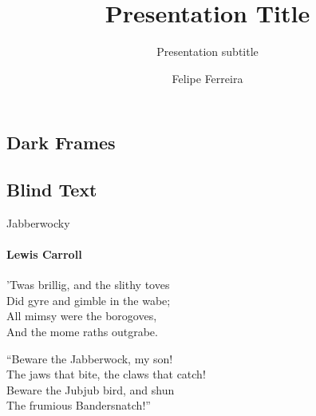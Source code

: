 \documentclass{beamer}
\title{Presentation Title}
\subtitle{Presentation subtitle}
\author{Felipe Ferreira}
\begin{document}
\frame[c]{\maketitle}


\begin{darkframes}
  \section{Dark Frames}
  \subsection{Blind Text}
  \begin{frame}{Jabberwocky}
    \framesubtitle{Lewis Carroll}%
    'Twas brillig, and the slithy toves\\
    Did gyre and gimble in the wabe;\\
    All mimsy were the borogoves,\\
    And the mome raths outgrabe.\\\bigskip

    “Beware the Jabberwock, my son!\\
    The jaws that bite, the claws that catch!\\
    Beware the Jubjub bird, and shun\\
    The frumious Bandersnatch!”\\
  \end{frame}


\end{darkframes}
\end{document}
